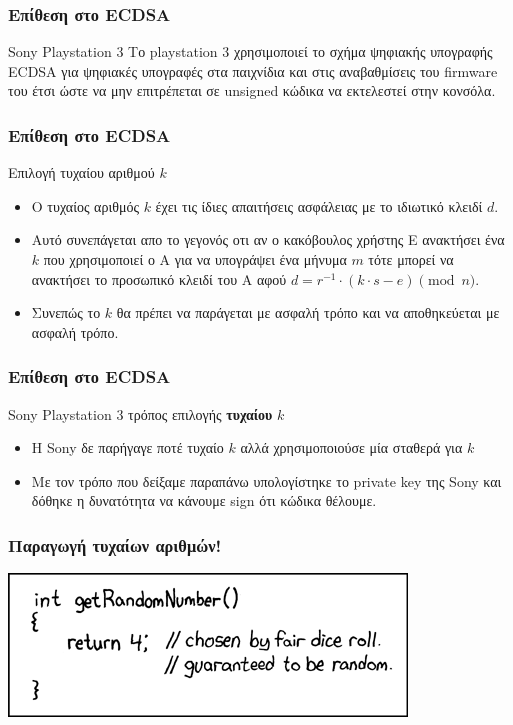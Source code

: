 \documentclass{beamer}
\begin{document}
%
\begin{frame}
\frametitle{Επίθεση στο ECDSA}
\begin{block}
{Sony Playstation 3}
Το playstation 3 χρησιμοποιεί το σχήμα ψηφιακής υπογραφής ECDSA για ψηφιακές υπογραφές στα παιχνίδια και στις αναβαθμίσεις του firmware του έτσι ώστε να μην επιτρέπεται σε unsigned κώδικα να εκτελεστεί στην κονσόλα.
\end{block}
\end{frame}

%
\begin{frame}
\frametitle{Επίθεση στο ECDSA}
\begin{block}
{Επιλογή τυχαίου αριθμού $k$}
\begin{itemize}
\item Ο τυχαίος αριθμός $k$ έχει τις ίδιες απαιτήσεις ασφάλειας με το ιδιωτικό κλειδί $d$. 
\item Αυτό συνεπάγεται απο το γεγονός οτι αν ο κακόβουλος χρήστης Ε ανακτήσει ένα $k$ που χρησιμοποιεί ο Α για να υπογράψει ένα μήνυμα $m$ τότε μπορεί να ανακτήσει το προσωπικό κλειδί του A αφού $d = r^{-1} \cdot (k \cdot s - e) \pmod n$.
\item Συνεπώς το $k$ θα πρέπει να παράγεται με ασφαλή τρόπο και να αποθηκεύεται με ασφαλή τρόπο.
\end{itemize}
\end{block}
\end{frame}

%
\begin{frame}
\frametitle{Επίθεση στο ECDSA}
\begin{block}
{Sony Playstation 3 τρόπος επιλογής \textbf{τυχαίου} $k$}
\begin{itemize}
\item Η Sony δε παρήγαγε ποτέ τυχαίο $k$ αλλά χρησιμοποιούσε μία σταθερά για $k$
\item Με τον τρόπο που δείξαμε παραπάνω υπολογίστηκε το private key της Sony και δόθηκε η δυνατότητα να κάνουμε sign ότι κώδικα θέλουμε. \cite{PS3}
\end{itemize}
\end{block}
\end{frame}

 \begin{frame}
\frametitle{Παραγωγή τυχαίων αριθμών! \cite{PS3}}
 \includegraphics[scale=0.7]{random_number.png}
\end{frame}
\end{document}
